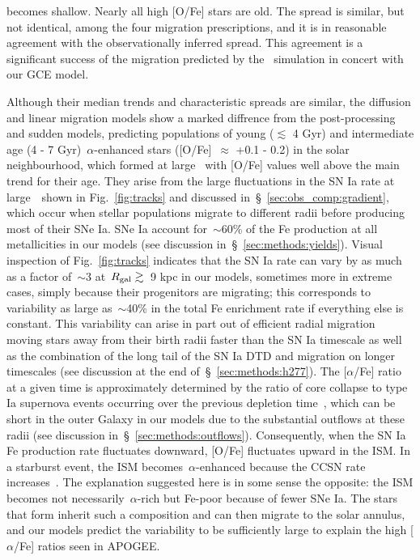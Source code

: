\documentclass[draft2.tex]{subfiles}
\begin{document}
becomes shallow. 
Nearly all high [O/Fe] stars are old. 
The spread is similar, but not identical, among the four migration 
prescriptions, and it is in reasonable agreement with the observationally 
inferred spread. 
This agreement is a significant success of the migration predicted by the
\hsim~simulation in concert with our GCE model. 
\par 
Although their median trends and characteristic spreads are similar, the 
diffusion and linear migration models show a marked diffrence from the 
post-processing and sudden models, predicting populations of young 
($\lesssim$ 4 Gyr) and intermediate age (4 - 7 Gyr)~$\alpha$-enhanced stars 
([O/Fe]~$\approx$ +0.1 - 0.2) in the solar neighbourhood, which formed at large 
\rgal~with [O/Fe] values well above the main trend for their age. 
They arise from the large fluctuations in the SN Ia rate at large~\rgal~shown 
in Fig.~\ref{fig:tracks} and discussed in~\S~\ref{sec:obs_comp:gradient}, 
which occur when stellar populations migrate to different radii before 
producing most of their SNe Ia. 
{\color{red} 
SNe Ia account for~$\sim$60\% of the Fe production at all metallicities 
in our models (see discussion in~\S~\ref{sec:methods:yields}). 
Visual inspection of Fig.~\ref{fig:tracks} indicates that the SN Ia rate can 
vary by as much as a factor of~$\sim$3 at~$R_\text{gal}\gtrsim$~9 kpc in our models, 
sometimes more in extreme cases, simply because their progenitors are 
migrating; this corresponds to variability as large as~$\sim$40\% in the total 
Fe enrichment rate if everything else is constant. 
This variability can arise in part out of efficient radial migration moving 
stars away from their birth radii faster than the SN Ia timescale as well as 
the combination of the long tail of the SN Ia DTD and migration on longer 
timescales (see discussion at the end of~\S~\ref{sec:methods:h277}). 
The [$\alpha$/Fe] ratio at a given time is approximately determined by the 
ratio of core collapse to type Ia supernova events occurring over the previous 
depletion time~\citep{Weinberg2017}, which can be short in the outer Galaxy in 
our models due to the substantial outflows at these radii (see discussion 
in~\S~\ref{sec:methods:outflows}). 
Consequently, when the SN Ia Fe production rate fluctuates downward, [O/Fe] 
fluctuates upward in the ISM. 
In a starburst event, the ISM becomes~$\alpha$-enhanced because the CCSN rate 
increases~\citep{Johnson2020}. 
The explanation suggested here is in some sense the opposite: the ISM 
becomes not necessarily~$\alpha$-rich but Fe-poor because of fewer SNe Ia. 
The stars that form inherit such a composition and can then migrate to 
the solar annulus, and our models predict the variability to be sufficiently 
large to explain the high [$\alpha$/Fe] ratios seen in APOGEE. 
}
\end{document}
